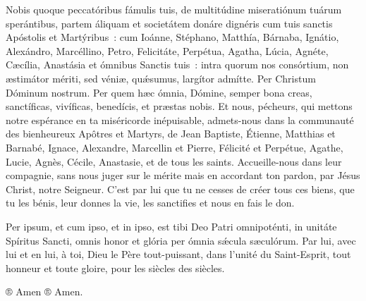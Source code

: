 \begin{paracol}{2}
\LigneParacol{0cm}
{Nobis quoque peccatóribus fámulis tuis, de multitúdine miseratiónum tuárum sperántibus, partem áliquam et societátem donáre dignéris cum tuis sanctis Apóstolis et Martýribus~: cum Ioánne, Stéphano, Matthía, Bárnaba, Ignátio, Alexándro, Marcéllino, Petro, Felicitáte, Perpétua, Agatha, Lúcia, Agnéte, Cæcília, Anastásia et ómnibus Sanctis tuis~: intra quorum nos consórtium, non æstimátor mériti, sed véniæ, quǽsumus, largítor admítte. Per Christum Dóminum nostrum. Per quem hæc ómnia, Dómine, semper bona creas, sanctíficas, vivíficas, benedícis, et præstas nobis.}
{Et nous, pécheurs, qui mettons notre espérance en ta miséricorde inépuisable, admets-nous dans la communauté des bienheureux Apôtres et Martyrs, de Jean Baptiste, Étienne, Matthias et Barnabé, Ignace, Alexandre, Marcellin et Pierre, Félicité et Perpétue, Agathe, Lucie, Agnès, Cécile, Anastasie, et de tous les saints. Accueille-nous dans leur compagnie, sans nous juger sur le mérite mais en accordant ton pardon, par Jésus Christ, notre Seigneur. C'est par lui que tu ne cesses de créer tous ces biens, que tu les bénis, leur donnes la vie, les sanctifies et nous en fais le don.}

\LigneParacol{0cm}
{Per ipsum, et cum ipso, et in ipso, est tibi Deo Patri omnipoténti, in unitáte Spíritus Sancti, omnis honor et glória per ómnia sǽcula sæculórum.}
{Par lui, avec lui et en lui, à toi, Dieu le Père tout-puissant, dans l'unité du Saint-Esprit, tout honneur et toute gloire, pour les siècles des siècles.}

\LigneParacol{0cm}
{® Amen}
{® Amen.}

\end{paracol}
